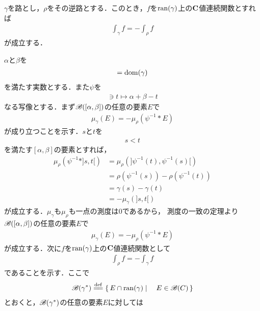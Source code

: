 	\begin{screen}
		\begin{thm}[逆路に関する積分は正負が逆転する]
			$\gamma$を路とし，$\rho$をその逆路とする．このとき，$f$を$\operatorname*{ran} (\gamma)$上の$\mathbf{C}$値連続関数とすれば
			\begin{align}
				\int_{\gamma} f = -\int_{\rho} f
			\end{align}
			が成立する．
		\end{thm}
	\end{screen}
	
	\begin{sketch}
		$\alpha$と$\beta$を
		\begin{align}
			[\alpha,\beta] = \dom{\gamma}
		\end{align}
		を満たす実数とする．また$\psi$を
		\begin{align}
			[\alpha,\beta] \ni t \longmapsto \alpha + \beta - t
		\end{align}
		なる写像とする．まず$\mathscr{B}([\alpha,\beta])$の任意の要素$E$で
		\begin{align}
			\mu_{\gamma}(E) = -\mu_{\rho}\left(\psi^{-1} \ast E\right)
		\end{align}
		が成り立つことを示す．$s$と$t$を
		\begin{align}
			s < t
		\end{align}
		を満たす$[\alpha,\beta]$の要素とすれば，
		\begin{align}
			\mu_{\rho}\left(\psi^{-1} \ast ]s,t[\right)
			&= \mu_{\rho}\left(]\psi^{-1}(t),\psi^{-1}(s)[\right) \\
			&= \rho(\psi^{-1}(s)) - \rho(\psi^{-1}(t)) \\
			&= \gamma(s) - \gamma(t) \\
			&= -\mu_{\gamma}(]s,t[)
		\end{align}
		が成立する．$\mu_{\gamma}$も$\mu_{\rho}$も一点の測度は$0$であるから，
		測度の一致の定理より$\mathscr{B}([\alpha,\beta])$の任意の要素$E$で
		\begin{align}
			\mu_{\gamma}(E) = -\mu_{\rho}\left(\psi^{-1} \ast E\right)
		\end{align}
		が成立する．次に$f$を$\operatorname*{ran} (\gamma)$上の$\mathbf{C}$値連続関数として
		\begin{align}
			\int_{\rho} f = -\int_{\gamma} f
		\end{align}
		であることを示す．ここで
		\begin{align}
			\borel{\gamma^*} \defeq \Set{E \cap \ran{\gamma}}{E \in \borel{C}}
		\end{align}
		とおくと，$\mathscr{B}(\gamma^*)$の任意の要素$E$に対しては

\end{sketch}
